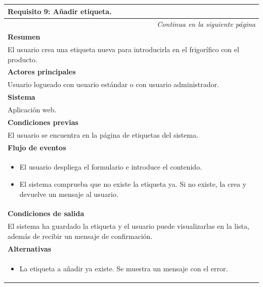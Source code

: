 \begin{longtable}{|p{}|}
\hline
 \rowcolor[gray]{.5}
 \color{white}\textbf{Requisito 9: Añadir etiqueta.} \\
\hline
\endfirsthead
\endhead
\hline \multicolumn{1}{r}{\textit{Continua en la siguiente página}} \\
\endfoot
\endlastfoot
    \rowcolor[gray]{.9}
     \textbf{Resumen} \\
     \hline
     El usuario crea una etiqueta nueva para introducirla en el frigorífico con el producto. \\
     \hline
     \rowcolor[gray]{.9}
     \textbf{Actores principales} \\
     \hline
     Usuario logueado con usuario estándar o con usuario administrador. \\
     \hline
     \rowcolor[gray]{.9}
     \textbf{Sistema} \\
     \hline
     Aplicación web. \\
     \hline
     \rowcolor[gray]{.9}
     \textbf{Condiciones previas} \\
     \hline
     El usuario se encuentra en la página de etiquetas del sistema. \\
     \hline
     \rowcolor[gray]{.9}
     \textbf{Flujo de eventos}  \\
     \hline
      \begin{itemize}
         \item El usuario despliega el formulario e introduce el contenido.
         \item El sistema comprueba que no existe la etiqueta ya. Si no existe, la crea y devuelve un mensaje al usuario.
     \end{itemize} \\
     \hline
     \rowcolor[gray]{.9}
     \textbf{Condiciones de salida} \\
     \hline
     El sistema ha guardado la etiqueta y el usuario puede visualizarlas en la lista, además de recibir un mensaje de confirmación. \\
     \hline
     \rowcolor[gray]{.9}
     \textbf{Alternativas}  \\
     \hline
      \begin{itemize}
         \item La etiqueta a añadir ya existe. Se muestra un mensaje con el error.
     \end{itemize} \\
     \hline
\end{longtable}

